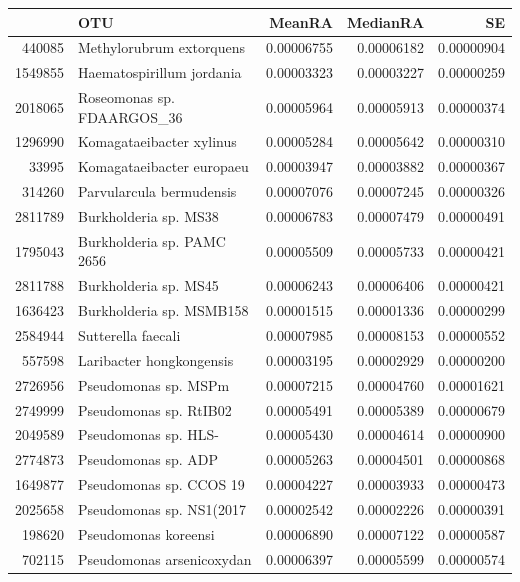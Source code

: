 \begin{table}[ht]
\centering
\begin{tabular}{rlrrr}
  \hline
 & OTU & MeanRA & MedianRA & SE \\ 
  \hline
440085 & Methylorubrum extorquens & 0.00006755 & 0.00006182 & 0.00000904 \\ 
  1549855 & Haematospirillum jordania & 0.00003323 & 0.00003227 & 0.00000259 \\ 
  2018065 & Roseomonas sp. FDAARGOS\_36 & 0.00005964 & 0.00005913 & 0.00000374 \\ 
  1296990 & Komagataeibacter xylinus & 0.00005284 & 0.00005642 & 0.00000310 \\ 
  33995 & Komagataeibacter europaeu & 0.00003947 & 0.00003882 & 0.00000367 \\ 
  314260 & Parvularcula bermudensis & 0.00007076 & 0.00007245 & 0.00000326 \\ 
  2811789 & Burkholderia sp. MS38 & 0.00006783 & 0.00007479 & 0.00000491 \\ 
  1795043 & Burkholderia sp. PAMC 2656 & 0.00005509 & 0.00005733 & 0.00000421 \\ 
  2811788 & Burkholderia sp. MS45 & 0.00006243 & 0.00006406 & 0.00000421 \\ 
  1636423 & Burkholderia sp. MSMB158 & 0.00001515 & 0.00001336 & 0.00000299 \\ 
  2584944 & Sutterella faecali & 0.00007985 & 0.00008153 & 0.00000552 \\ 
  557598 & Laribacter hongkongensis & 0.00003195 & 0.00002929 & 0.00000200 \\ 
  2726956 & Pseudomonas sp. MSPm & 0.00007215 & 0.00004760 & 0.00001621 \\ 
  2749999 & Pseudomonas sp. RtIB02 & 0.00005491 & 0.00005389 & 0.00000679 \\ 
  2049589 & Pseudomonas sp. HLS- & 0.00005430 & 0.00004614 & 0.00000900 \\ 
  2774873 & Pseudomonas sp. ADP & 0.00005263 & 0.00004501 & 0.00000868 \\ 
  1649877 & Pseudomonas sp. CCOS 19 & 0.00004227 & 0.00003933 & 0.00000473 \\ 
  2025658 & Pseudomonas sp. NS1(2017 & 0.00002542 & 0.00002226 & 0.00000391 \\ 
  198620 & Pseudomonas koreensi & 0.00006890 & 0.00007122 & 0.00000587 \\ 
  702115 & Pseudomonas arsenicoxydan & 0.00006397 & 0.00005599 & 0.00000574 \\ 

\end{tabular}
\end{table}
